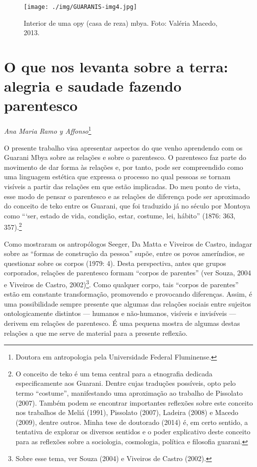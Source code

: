 \begin{figure}
  \centering
 \texttt{[image: ./img/GUARANIS-img4.jpg]}	
  \hfill
  \caption{Interior de uma opy (casa de reza) mbya. Foto: Valéria Macedo, 2013.}
\end{figure}


\chapter{O que nos levanta sobre a terra: alegria e saudade fazendo
parentesco}
\begin{flushright}
\emph{Ana Maria Ramo y Affonso}\footnote{Doutora em antropologia pela
Universidade Federal Fluminense.}
\end{flushright}

O presente trabalho visa apresentar aspectos do que venho aprendendo com
os Guarani Mbya sobre as relações e sobre o parentesco. O parentesco
faz parte do movimento de dar forma às relações e, por tanto, pode ser
compreendido como uma linguagem estética que expressa o processo no
qual pessoas se tornam visíveis a partir das relações em que estão
implicadas. Do meu ponto de vista, esse modo de pensar o parentesco e
as relações de diferença pode ser aproximado do conceito de teko entre
os Guarani, que foi traduzido já no século  por Montoya como ``‘ser,
estado de vida, condição, estar, costume, lei, hábito'' (1876: 363,
357).\footnote{O conceito de teko é um tema central para a etnografia
dedicada especificamente aos Guarani. Dentre cujas traduções possíveis,
opto pelo termo ``costume'', manifestando uma aproximação ao trabalho de
Pissolato (2007). Também podem se encontrar importantes reflexões sobre
este conceito nos trabalhos de Meliá (1991), Pissolato (2007), Ladeira
(2008) e Macedo (2009), dentre outros. Minha tese de doutorado (2014)
é, em certo sentido, a tentativa de explorar os diversos sentidos e o
poder explicativo deste conceito para as reflexões sobre a sociologia,
cosmologia, política e filosofia guarani.}

Como mostraram os antropólogos Seeger, Da Matta e Viveiros de Castro,
indagar sobre as ``formas de construção da pessoa'' supõe, entre os povos
ameríndios, se questionar sobre os corpos (1979: 4). Desta perspectiva,
antes que grupos corporados, relações de parentesco formam ``corpos de
parentes'' (ver Souza, 2004 e Viveiros de Castro, 2002)\footnote{Sobre
esse tema, ver Souza (2004) e Viveiros de Castro (2002).}. Como
qualquer corpo, tais ``corpos de parentes'' estão em constante
transformação, promovendo e provocando diferenças. Assim, é uma
possibilidade sempre presente que algumas das relações sociais entre
sujeitos ontologicamente distintos — humanos e não-humanos, visíveis e
invisíveis — derivem em relações de parentesco. É uma pequena mostra de
algumas destas relações a que me serve de material para a presente
reflexão.

